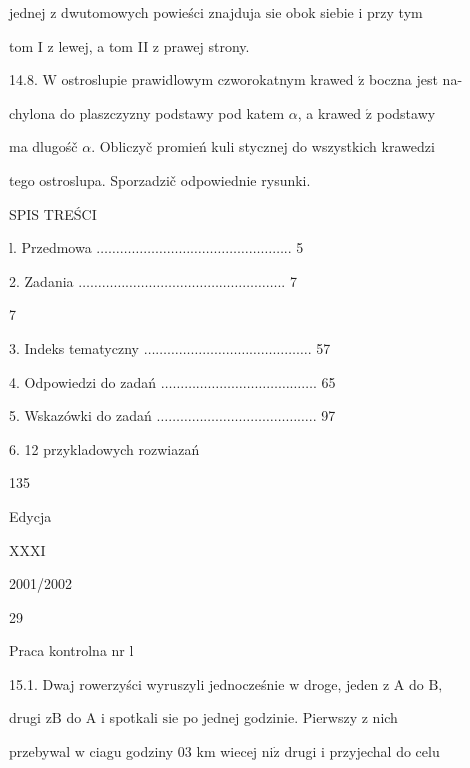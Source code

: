 \documentclass[a4paper,12pt]{article}
\begin{document}
jednej $\mathrm{z}$ dwutomowych powieści znajduja $\mathrm{s}\mathrm{i}\mathrm{e}$ obok siebie $\mathrm{i}$ przy tym

tom I $\mathrm{z}$ lewej, a tom II $\mathrm{z}$ prawej strony.

14.8. $\mathrm{W}$ ostroslupie prawidlowym czworokatnym krawed $\acute{\mathrm{z}}$ boczna jest na-

chylona do plaszczyzny podstawy pod katem $\alpha$, a krawed $\acute{\mathrm{z}}$ podstawy

ma dlugośč $\alpha$. Obliczyč promień kuli stycznej do wszystkich krawedzi

tego ostroslupa. Sporzadzič odpowiednie rysunki.





SPIS TREŚCI

l. Przedmowa $\ldots\ldots\ldots\ldots\ldots\ldots\ldots\ldots\ldots\ldots\ldots\ldots\ldots\ldots\ldots\ldots$.. 5

2. Zadania $\ldots\ldots\ldots\ldots\ldots\ldots\ldots\ldots\ldots\ldots\ldots\ldots\ldots\ldots\ldots\ldots\ldots$.. 7

7

3. Indeks tematyczny $\ldots\ldots\ldots\ldots\ldots\ldots\ldots\ldots\ldots\ldots\ldots\ldots\ldots\ldots$. 57

4. Odpowiedzi do zadań $\ldots\ldots\ldots\ldots\ldots\ldots\ldots\ldots\ldots\ldots\ldots\ldots\ldots$. 65

5. Wskazówki do zadań $\ldots\ldots\ldots\ldots\ldots\ldots\ldots\ldots\ldots\ldots\ldots\ldots\ldots$.. 97

6. 12 przykladowych rozwiazań

135





Edycja

XXXI

2001/2002





29

Praca kontrolna nr l

15.1. Dwaj rowerzyści wyruszyli jednocześnie $\mathrm{w}$ droge, jeden $\mathrm{z}$ A do $\mathrm{B},$

drugi $\mathrm{z} \mathrm{B}$ do A $\mathrm{i}$ spotkali $\mathrm{s}\mathrm{i}\mathrm{e}$ po jednej godzinie. Pierwszy $\mathrm{z}$ nich

przebywal $\mathrm{w}$ ciagu godziny $03$ km wiecej $\mathrm{n}\mathrm{i}\dot{\mathrm{z}}$ drugi $\mathrm{i}$ przyjechal do celu
\end{document}
